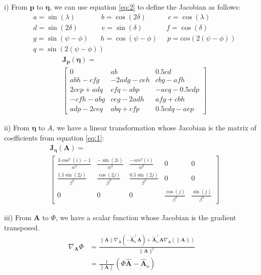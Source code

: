 \documentclass[preprint]{seismica}
\begin{document}
    i) From $\bm{p}$ to $\bm{\eta}$, we can use equation \ref{eq:2} to define the Jacobian
    as follows:
    \begin{align*}
      &a = \sin(\lambda)\;\;\;\;\;\;\;\;\;\;\;\;\; b = \cos(2\delta)\;\;\;\;\;\;\;\;\;\;\; c = \cos(\lambda)\\
      &d = \sin(2\delta)\;\;\;\;\;\;\;\;\;\;\;\; e = \sin(\delta)\;\;\;\;\;\;\;\;\;\;\;\; f = \cos(\delta)\\
      &g = \sin(\psi - \phi)\;\;\;\;\;\; h = \cos(\psi - \phi)\;\;\;\;\; p = cos(2(\psi - \phi))\\
      &q = \sin(2(\psi - \phi))
    \end{align*}
    \begin{align} \label{eq:19}
      \nonumber&\bm{J_p}(\bm{\eta}) = \\
      &\begin{bmatrix}
        0         &ab         &0.5cd\\
        abh-cfg   &-2adg-ceh  &cbg-afh\\
        2cep+adq  &cfq-abp    &-aeq-0.5cdp\\
        -cfh-abg  &ceg-2adh   &afg+cbh\\
        adp-2ceq  &abq+cfp    &0.5cdq-aep
      \end{bmatrix}
    \end{align}

    ii) From $\bm{\eta}$ to $A$, we have a linear transformation whose Jacobian is the matrix
    of coefficients from equation \ref{eq:1}:
    \begin{align} \label{eq:20}
      \nonumber&\bm{J_\eta}(\bm{A}) = \\
      &\begin{bmatrix}
        \frac{3\cos^2(i)-1}{\alpha^3}    &\frac{-\sin(2i)}{\alpha^3}    &\frac{-sin^2(i)}{\alpha^3}   &0    &0\\
        \frac{1.5\sin(2j)}{\beta^3}      &\frac{\cos(2j)}{\beta^3}      &\frac{0.5\sin(2j)}{\beta^3}  &0    &0\\
        0         &0           &0        &\frac{\cos(j)}{\beta^3}       &\frac{\sin(j)}{\beta^3}
      \end{bmatrix}
    \end{align}

    iii) From $\bm{A}$ to $\Phi$, we have a scalar function whose Jacobian is the gradient
    transposed.
    \begin{align} \label{eq:21}
      \nonumber\nabla_{\bm{A}}\Phi &= \frac{\|\bm{A}\|\nabla_{\bm{A}}(-\hat{\bm{A}}_o^\top\bm{A}) + 
      \hat{\bm{A}}_o^\top \bm{A} \nabla_{\bm{A}}(\|\bm{A}\|)}{\|\bm{A}\|^2}\\
            &= \frac{1}{\|\bm{A}\|}(\Phi\hat{\bm{A}} - \hat{\bm{A}}_o)
    \end{align}
\end{document}
